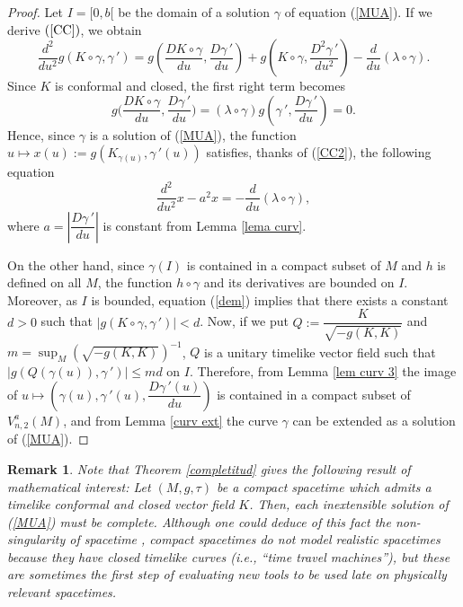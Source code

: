 \documentclass[11pt]{book}
\newtheorem{rem}[defi]{Remark}
\begin{document}
\begin{proof}
	Let $I=[0,b[$ be the domain of a solution $\gamma$ of equation {\rm (\ref{MUA})}. 
	If we derive $(\ref{CC})$, we obtain
	\begin{equation}\label{CC2}
	\dfrac{d^2}{du^2}g\left(K\circ \gamma,\gamma{\,'}\right)=g\left(\dfrac{DK\circ \gamma}{du},\dfrac{D\gamma{\,'}}{du}\right)+g\left(K\circ \gamma,\dfrac{D^2\gamma{\,'}}{du^2}\right)-\dfrac{d}{du}(\lambda\circ \gamma).
	\end{equation}
	Since $K$ is conformal and closed, the first right term becomes
	\[
	g\Big(\dfrac{DK\circ \gamma}{du},\dfrac{D\gamma{\,'}}{du}\Big)=(\lambda\circ \gamma)g\left(\gamma{\,'},\dfrac{D\gamma{\,'}}{du}\right)=0.
	\]
	Hence, since $\gamma$ is a solution of (\ref{MUA}), the function $u\longmapsto x(u):=g(K_{\gamma(u)}, \gamma{\,'}(u))$ satisfies, thanks of (\ref{CC2}), the following equation
	\begin{equation}\label{dem}
		\dfrac{d^2}{du^2}x-a^2 x=-\frac{d}{du}(\lambda\circ \gamma),
	\end{equation}
	where $a=\left|\dfrac{D\gamma{\,'}}{du}\right|$ is constant from Lemma \ref{lema curv}. 
	
	On the other hand, since $\gamma(I)$ is contained in a compact subset of $M$ and $h$ is defined on all $M$, the function $h\circ \gamma$ and its derivatives are bounded on $I$. Moreover, as $I$ is bounded, equation {\rm (\ref{dem})} implies that there exists a constant $d>0$ such that $|g(K\circ \gamma,\gamma{\,'})|<d$. 
	Now, if we put $Q:=\dfrac{K}{\sqrt{-g(K,K)}}$ and $m=\sup_M\left(\sqrt{-g(K,K)}\right)^{-1}$, $Q$ is a unitary timelike vector field such that $|g(Q(\gamma(u)),\gamma{\,'})|\le md$ on $I$. Therefore, from Lemma \ref{lem curv 3} the image of $u\longmapsto \left( \gamma(u), \gamma{\,'}(u), \dfrac{D\gamma{\,'}(u)}{du} \right)$ is contained in a compact subset of $V_{n,2}^a(M)$, and from Lemma \ref{curv ext} the curve $\gamma$ can be extended as a solution of (\ref{MUA}).
\end{proof}

\begin{rem}
{\rm  Note that Theorem \ref{completitud} gives the following result of mathematical interest: Let $(M,g,\tau)$ be a compact spacetime which admits a timelike conformal and closed vector field $K$. Then, each inextensible solution of {\rm (\ref{MUA})} must be complete. Although one could deduce of this fact the non-singularity of spacetime \cite{SgG}, compact spacetimes do not model realistic spacetimes because they have closed timelike curves (i.e., ``time travel machines''), but these are sometimes the first step of evaluating new tools to be used late on physically relevant spacetimes. }
\end{rem}
\end{document}
